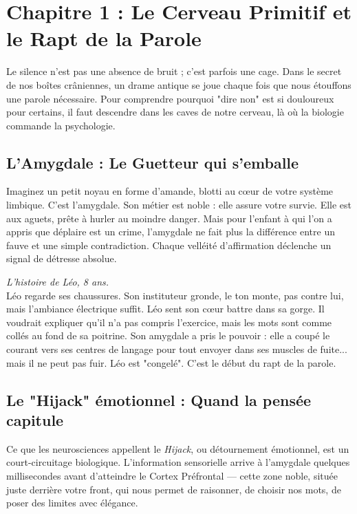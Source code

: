 \documentclass[11.5pt,a4paper]{article}
\begin{document}
\chapter*{Chapitre 1 : Le Cerveau Primitif et le Rapt de la Parole}

Le silence n'est pas une absence de bruit ; c'est parfois une cage. Dans le secret de nos boîtes crâniennes, un drame antique se joue chaque fois que nous étouffons une parole nécessaire. Pour comprendre pourquoi "dire non" est si douloureux pour certains, il faut descendre dans les caves de notre cerveau, là où la biologie commande la psychologie.

\section{L'Amygdale : Le Guetteur qui s'emballe}
Imaginez un petit noyau en forme d'amande, blotti au cœur de votre système limbique. C'est l'amygdale. Son métier est noble : elle assure votre survie. Elle est aux aguets, prête à hurler au moindre danger. Mais pour l'enfant à qui l'on a appris que déplaire est un crime, l'amygdale ne fait plus la différence entre un fauve et une simple contradiction. Chaque velléité d'affirmation déclenche un signal de détresse absolue.

\begin{FocusHumain}
\textit{L'histoire de Léo, 8 ans.} \\
Léo regarde ses chaussures. Son instituteur gronde, le ton monte, pas contre lui, mais l'ambiance électrique suffit. Léo sent son cœur battre dans sa gorge. Il voudrait expliquer qu'il n'a pas compris l'exercice, mais les mots sont comme collés au fond de sa poitrine. Son amygdale a pris le pouvoir : elle a coupé le courant vers ses centres de langage pour tout envoyer dans ses muscles de fuite... mais il ne peut pas fuir. Léo est "congelé". C'est le début du rapt de la parole.
\end{FocusHumain}

\section{Le "Hijack" émotionnel : Quand la pensée capitule}
Ce que les neurosciences appellent le \textit{Hijack}, ou détournement émotionnel, est un court-circuitage biologique. L'information sensorielle arrive à l'amygdale quelques millisecondes avant d'atteindre le Cortex Préfrontal — cette zone noble, située juste derrière votre front, qui nous permet de raisonner, de choisir nos mots, de poser des limites avec élégance.
\end{document}
